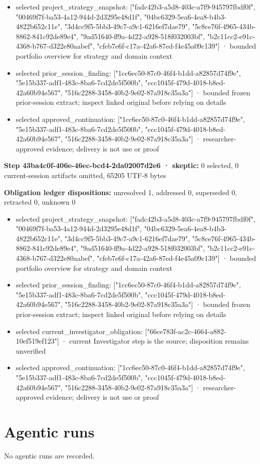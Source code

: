 \documentclass[11pt]{article}
\begin{document}
\begin{itemize}
\item selected project\_strategy\_snapshot: ["fadc42b3-a5d8-403c-a7f9-945797fbdf0f", "00469f7f-ba53-4a12-944d-2d3295e48d1f", "04bc6329-5ea6-4ea8-b4b3-4822b652c11e", "3d4cc9f5-5bb3-49c7-a9c1-6216ef7dae79", "5c8ce76f-4965-434b-8862-841c92de89e4", "9ad51640-ff9a-4d22-a928-518f032003bf", "b2c11cc2-e91c-4368-b767-d322e80aabef", "cfeb7e6f-c17a-42a6-87ed-f4e45a09c139"] · bounded portfolio overview for strategy and domain context
\item selected prior\_session\_finding: ["1cc6ec50-87c0-46f4-b1dd-a82857d74f9e", "5e15b337-adf1-483c-8ba6-7cd2de5f500b", "ccc1045f-479d-4018-b8ed-42a60b94e567", "516c2288-3458-40b2-9e02-87a918c35a3a"] · bounded frozen prior-session extract; inspect linked original before relying on details
\item selected approved\_continuation: ["1cc6ec50-87c0-46f4-b1dd-a82857d74f9e", "5e15b337-adf1-483c-8ba6-7cd2de5f500b", "ccc1045f-479d-4018-b8ed-42a60b94e567", "516c2288-3458-40b2-9e02-87a918c35a3a"] · researcher-approved evidence; delivery is not use or proof
\end{itemize}
\textbf{Step 43ba4c0f-406e-46ec-bcd4-2da02007d2e6 · skeptic:} 0 selected, 0 current-session artifacts omitted, 65205 UTF-8 bytes\par
\textbf{Obligation ledger dispositions:} unresolved 1, addressed 0, superseded 0, retracted 0, unknown 0\par
\begin{itemize}
\item selected project\_strategy\_snapshot: ["fadc42b3-a5d8-403c-a7f9-945797fbdf0f", "00469f7f-ba53-4a12-944d-2d3295e48d1f", "04bc6329-5ea6-4ea8-b4b3-4822b652c11e", "3d4cc9f5-5bb3-49c7-a9c1-6216ef7dae79", "5c8ce76f-4965-434b-8862-841c92de89e4", "9ad51640-ff9a-4d22-a928-518f032003bf", "b2c11cc2-e91c-4368-b767-d322e80aabef", "cfeb7e6f-c17a-42a6-87ed-f4e45a09c139"] · bounded portfolio overview for strategy and domain context
\item selected prior\_session\_finding: ["1cc6ec50-87c0-46f4-b1dd-a82857d74f9e", "5e15b337-adf1-483c-8ba6-7cd2de5f500b", "ccc1045f-479d-4018-b8ed-42a60b94e567", "516c2288-3458-40b2-9e02-87a918c35a3a"] · bounded frozen prior-session extract; inspect linked original before relying on details
\item selected current\_investigator\_obligation: ["66ce783f-ac2c-4664-a882-10ef519ef123"] · current Investigator step is the source; disposition remains unverified
\item selected approved\_continuation: ["1cc6ec50-87c0-46f4-b1dd-a82857d74f9e", "5e15b337-adf1-483c-8ba6-7cd2de5f500b", "ccc1045f-479d-4018-b8ed-42a60b94e567", "516c2288-3458-40b2-9e02-87a918c35a3a"] · researcher-approved evidence; delivery is not use or proof
\end{itemize}
\section{Agentic runs}
No agentic runs are recorded.\par
\end{document}
